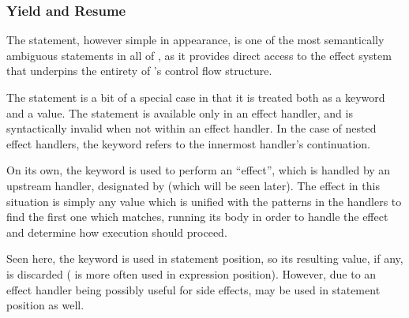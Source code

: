 \subsubsection{Yield and Resume}

The  statement, however simple in appearance, is one of the most
semantically ambiguous statements in all of \Trilogy{}, as it provides direct
access to the effect system that underpins the entirety of \Trilogy{}'s control
flow structure.

The  statement is a bit of a special case in that it is
treated both as a keyword and a value. The  statement is available only
in an effect handler, and is syntactically invalid when not within an effect handler.
In the case of nested effect handlers, the  keyword refers to the innermost
handler's continuation.


\begin{bnf*}
\end{bnf*}

On its own, the  keyword is used to perform an ``effect'', which is
handled by an upstream handler, designated by  (which will be seen later).
The effect in this situation is simply any value which is unified with the patterns
in the handlers to find the first one which matches, running its body in order to
handle the effect and determine how execution should proceed.

Seen here, the  keyword is used in statement position, so its resulting
value, if any, is discarded ( is more often used in expression position).
However, due to an effect handler being possibly useful for side effects, 
may be used in statement position as well.

\begin{prooftree}
\end{prooftree}
